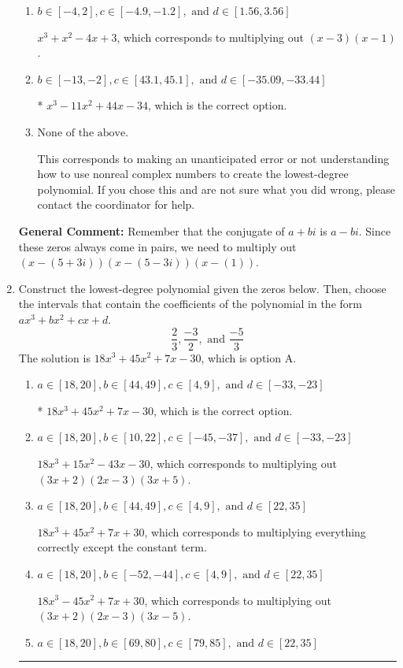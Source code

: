 \documentclass{extbook}[14pt]
\newcommand{\litem}[1]{\item #1

\rule{\textwidth}{0.4pt}}
\begin{document}
\begin{enumerate}
{\begin{enumerate}[label=\Alph*.]
$x^{3} + x^{2} -6 x + 5$, which corresponds to multiplying out $(x -5)(x -1)$.
\item \( b \in [-4, 2], c \in [-4.9, -1.2], \text{ and } d \in [1.56, 3.56] \)

$x^{3} + x^{2} -4 x + 3$, which corresponds to multiplying out $(x -3)(x -1)$.
\item \( b \in [-13, -2], c \in [43.1, 45.1], \text{ and } d \in [-35.09, -33.44] \)

* $x^{3} -11 x^{2} +44 x -34$, which is the correct option.
\item \( \text{None of the above.} \)

This corresponds to making an unanticipated error or not understanding how to use nonreal complex numbers to create the lowest-degree polynomial. If you chose this and are not sure what you did wrong, please contact the coordinator for help.
\end{enumerate}

\textbf{General Comment:} Remember that the conjugate of $a+bi$ is $a-bi$. Since these zeros always come in pairs, we need to multiply out $(x-(5 + 3 i))(x-(5 - 3 i))(x-(1))$.
}
\litem{
Construct the lowest-degree polynomial given the zeros below. Then, choose the intervals that contain the coefficients of the polynomial in the form $ax^3+bx^2+cx+d$.
\[ \frac{2}{3}, \frac{-3}{2}, \text{ and } \frac{-5}{3} \]The solution is \( 18x^{3} +45 x^{2} +7 x -30 \), which is option A.\begin{enumerate}[label=\Alph*.]
\item \( a \in [18, 20], b \in [44, 49], c \in [4, 9], \text{ and } d \in [-33, -23] \)

* $18x^{3} +45 x^{2} +7 x -30$, which is the correct option.
\item \( a \in [18, 20], b \in [10, 22], c \in [-45, -37], \text{ and } d \in [-33, -23] \)

$18x^{3} +15 x^{2} -43 x -30$, which corresponds to multiplying out $(3x + 2)(2x -3)(3x + 5)$.
\item \( a \in [18, 20], b \in [44, 49], c \in [4, 9], \text{ and } d \in [22, 35] \)

$18x^{3} +45 x^{2} +7 x + 30$, which corresponds to multiplying everything correctly except the constant term.
\item \( a \in [18, 20], b \in [-52, -44], c \in [4, 9], \text{ and } d \in [22, 35] \)

$18x^{3} -45 x^{2} +7 x + 30$, which corresponds to multiplying out $(3x + 2)(2x -3)(3x -5)$.
\item \( a \in [18, 20], b \in [69, 80], c \in [79, 85], \text{ and } d \in [22, 35] \)


\end{enumerate}}
\end{enumerate}
\end{document}
